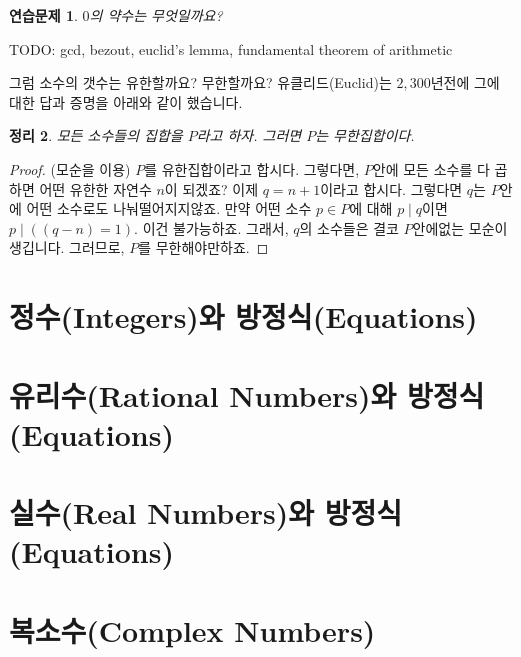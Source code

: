 \documentclass[a4paper, 11pt]{report}
\renewcommand{\<}{\langle}
\renewcommand{\>}{\rangle}
\newtheorem{thm}{정리}[section]
\newtheorem{exercise}[thm]{연습문제}
\begin{document}
\begin{exercise}
  $0$의 약수는 무엇일까요? 
\end{exercise}

TODO: gcd, bezout, euclid's lemma, fundamental theorem of arithmetic


그럼 소수의 갯수는 유한할까요? 무한할까요? 유클리드(Euclid)는 $2,300$년전에 그에 대한 답과
증명을 아래와 같이 했습니다.

\begin{thm}
  모든 소수들의 집합을 $P$라고 하자. 그러면 $P$는 무한집합이다. 
\end{thm}

\begin{proof}
  (모순을 이용) $P$를 유한집합이라고 합시다. 그렇다면, $P$안에 모든 소수를 다 곱하면 어떤 유한한 
  자연수 $n$이 되겠죠? 이제 $q = n+1$이라고 합시다. 그렇다면 $q$는 $P$안에 어떤 소수로도 나눠떨어지지않죠.
  만약 어떤 소수 $p \in P$에 대해 $p \mid q$이면 $p \mid ((q-n) = 1)$. 이건 불가능하죠.
  그래서, $q$의 소수들은 결코 $P$안에없는 모순이 생깁니다. 그러므로, $P$를 무한해야만하죠.
\end{proof}

\section{정수(Integers)와 방정식(Equations)}

\section{유리수(Rational Numbers)와 방정식(Equations)}

\section{실수(Real Numbers)와 방정식(Equations)}

\section{복소수(Complex Numbers)} 



\end{document}
